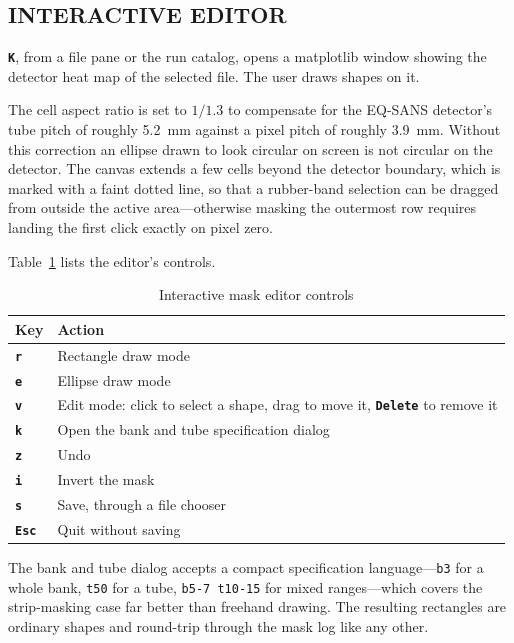\documentclass[tm]{ornltm}
\newcommand{\key}[1]{\textbf{\texttt{#1}}}
\begin{document}
\subsection{INTERACTIVE EDITOR}

\key{K}, from a file pane or the run catalog, opens a matplotlib window showing
the detector heat map of the selected file. The user draws shapes on it.

The cell aspect ratio is set to $1/1.3$ to compensate for the EQ-SANS detector's
tube pitch of roughly 5.2~mm against a pixel pitch of roughly 3.9~mm. Without
this correction an ellipse drawn to look circular on screen is not circular on
the detector. The canvas extends a few cells beyond the detector boundary, which
is marked with a faint dotted line, so that a rubber-band selection can be
dragged from outside the active area---otherwise masking the outermost row
requires landing the first click exactly on pixel zero.

Table~\ref{tab:maskkeys} lists the editor's controls.

\begin{table}[ht]
  \centering
  \caption{Interactive mask editor controls}
  \label{tab:maskkeys}
  \small
  \begin{tabular}{l p{}}
    \toprule
    Key & Action \\
    \midrule
    \key{r} & Rectangle draw mode \\
    \key{e} & Ellipse draw mode \\
    \key{v} & Edit mode: click to select a shape, drag to move it, \key{Delete}
      to remove it \\
    \key{k} & Open the bank and tube specification dialog \\
    \key{z} & Undo \\
    \key{i} & Invert the mask \\
    \key{s} & Save, through a file chooser \\
    \key{Esc} & Quit without saving \\
    \bottomrule
  \end{tabular}
\end{table}

The bank and tube dialog accepts a compact specification language---\texttt{b3}
for a whole bank, \texttt{t50} for a tube, \texttt{b5-7 t10-15} for mixed
ranges---which covers the strip-masking case far better than freehand drawing.
The resulting rectangles are ordinary shapes and round-trip through the mask log
like any other.
\end{document}
